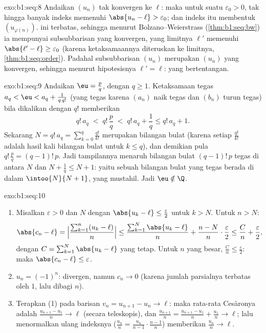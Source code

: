 \begin{solution}{exo:b1:seq:8}
Andaikan $(u_n)$ tak konvergen ke $\ell$: maka untuk suatu $\varepsilon_0
> 0$, tak hingga banyak indeks memenuhi $\abs{u_n - \ell} >
\varepsilon_0$; dan indeks itu membentuk  $(u_{\varphi(n)})$. 
ini terbatas, sehingga menurut Bolzano--Weierstrass
(\cref{thm:b1:seq:bw}) ia mempunyai subsubbarisan yang konvergen, yang
limitnya $\ell'$ memenuhi $\abs{\ell' - \ell} \geq \varepsilon_0$
(karena ketaksamaannya diteruskan ke limitnya, \cref{thm:b1:seq:order}). Padahal
subsubbarisan $(u_n)$ merupakan  $(u_n)$ yang konvergen,
sehingga menurut hipotesisnya $\ell' = \ell$: yang bertentangan.
\end{solution}

\begin{solution}{exo:b1:seq:9}
Andaikan $\eu = \frac pq$, dengan $q \geq 1$. Ketaksamaan tegas $a_q <
\eu < a_q + \frac{1}{q\,q!}$ (yang tegas karena $(a_n)$ naik tegas
dan $(b_n)$ turun tegas) bila dikalikan dengan $q!$ memberikan
\[
q!\,a_q \;<\; q!\,\frac pq \;<\; q!\,a_q + \frac 1q \leq q!\,a_q + 1.
\]
Sekarang $N = q!\,a_q = \sum_{k=0}^{q} \frac{q!}{k!}$ merupakan bilangan bulat (karena setiap
$\frac{q!}{k!}$ adalah hasil kali bilangan bulat untuk $k \leq q$), dan demikian pula
$q!\,\frac pq = (q-1)!\,p$. Jadi tampilannya menaruh bilangan bulat
$(q-1)!\,p$ tegas di antara $N$ dan $N + \frac 1q \leq N + 1$: yaitu sebuah
bilangan bulat yang tegas berada di dalam $\intoo{N}{N+1}$, yang mustahil. Jadi
$\eu \notin \Q$.
\end{solution}

\begin{solution}{exo:b1:seq:10}
\begin{enumerate}
  \item Misalkan $\varepsilon > 0$ dan $N$ dengan $\abs{u_k - \ell} \leq
        \frac{\varepsilon}{2}$ untuk $k > N$. Untuk $n > N$:
        \[
        \abs{c_n - \ell}
        = \Bigl|\frac{\sum_{k=1}^{n}(u_k - \ell)}{n}\Bigr|
        \leq \frac{\sum_{k=1}^{N} \abs{u_k - \ell}}{n}
        + \frac{n - N}{n}\cdot\frac{\varepsilon}{2}
        \leq \frac{C}{n} + \frac{\varepsilon}{2},
        \]
        dengan $C = \sum_{k=1}^N \abs{u_k - \ell}$ yang tetap. Untuk $n$
        yang besar, $\frac Cn \leq \frac\varepsilon2$: maka $\abs{c_n -
        \ell} \leq \varepsilon$.
  \item $u_n = (-1)^n$: divergen, namun $c_n \to 0$ (karena jumlah parsialnya
        terbatas oleh $1$, lalu dibagi $n$).
  \item Terapkan (1) pada barisan $v_n = u_{n+1} - u_n \to \ell$: maka
        rata-rata Cesàronya adalah $\frac{u_{n+1} - u_1}{n} \to \ell$
        (secara teleskopis), dan $\frac{u_{n+1}}{n} = \frac{u_{n+1} -
        u_1}{n} + \frac{u_1}{n} \to \ell$; lalu menormalkan ulang indeksnya
        ($\frac{u_n}{n} = \frac{u_n}{n-1}\cdot\frac{n-1}{n}$) memberikan
        $\frac{u_n}{n} \to \ell$.
\end{enumerate}
\end{solution}

